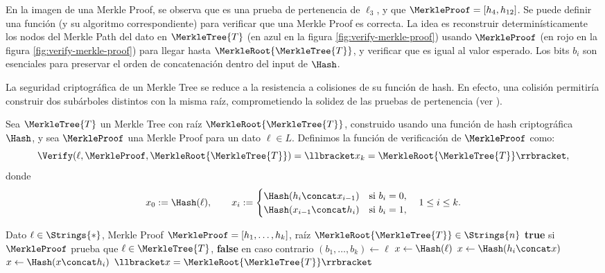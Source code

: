 En la imagen de una Merkle Proof, se observa que es una prueba de pertenencia de $\ell_3$, y que $\MerkleProof = [h_4, h_{12}]$. Se puede definir una función (y su algoritmo correspondiente) para verificar que una Merkle Proof es correcta. La idea es reconstruir determinísticamente los nodos del Merkle Path del dato en $\MerkleTree{T}$ (en azul en la figura \ref{fig:verify-merkle-proof}) usando $\MerkleProof$ (en rojo en la figura \ref{fig:verify-merkle-proof}) para llegar hasta $\MerkleRoot{\MerkleTree{T}}$, y verificar que es igual al valor esperado. Los bits $b_i$ son esenciales para preservar el orden de concatenación dentro del input de $\Hash$.

La seguridad criptográfica de un Merkle Tree se reduce a la resistencia a colisiones de su función de hash. En efecto, una colisión permitiría construir dos subárboles distintos con la misma raíz, comprometiendo la solidez de las pruebas de pertenencia (ver \cite{hac,katz}).

\begin{definition}
	Sea $\MerkleTree{T}$ un Merkle Tree con raíz $\MerkleRoot{\MerkleTree{T}}$, construido usando una función de hash criptográfica $\Hash$, y sea $\MerkleProof$ una Merkle Proof para un dato $\ell \in L$. Definimos la función de verificación de $\MerkleProof$ como:
	$$\Verify(\ell, \MerkleProof, \MerkleRoot{\MerkleTree{T}}) = \llbracket x_k = \MerkleRoot{\MerkleTree{T}} \rrbracket,$$
	donde
	$$x_0 := \Hash(\ell), \qquad x_i := \begin{cases}
		\Hash(h_i \concat x_{i-1}) & \text{si } b_i = 0, \\
		\Hash(x_{i-1} \concat h_i) & \text{si } b_i = 1,
	\end{cases} \quad 1 \leq i \leq k.$$
\end{definition}

\begin{algorithm}[h]
	\caption{Verificación de una Merkle Proof}
	\label{alg:verify-merkle-proof}
	\begin{algorithmic}[1]
		\Require Dato $\ell \in \Strings{*}$, Merkle Proof $\MerkleProof = [h_1, \ldots, h_k]$, raíz $\MerkleRoot{\MerkleTree{T}} \in \Strings{n}$
		\Ensure \textbf{true} si $\MerkleProof$ prueba que $\ell \in \MerkleTree{T}$, \textbf{false} en caso contrario
		\State $(b_1, \ldots, b_k) \gets \ell$ 
		\State $x \gets \Hash(\ell)$
		 
		\State $x \gets \Hash(h_i \concat x)$
		\Else {}
		\State $x \gets \Hash(x \concat h_i)$
		\EndIf
		\EndFor
		\State \Return $\llbracket x = \MerkleRoot{\MerkleTree{T}} \rrbracket$
	\end{algorithmic}
\end{algorithm}

